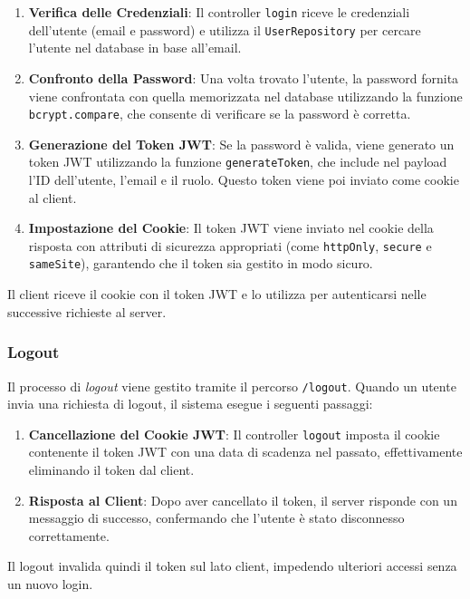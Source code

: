 \documentclass[twoside]{supsistudent}
\begin{document}
\begin{enumerate}
  \item \textbf{Verifica delle Credenziali}: Il controller \texttt{login} riceve le credenziali dell'utente (email e password) e utilizza il \texttt{UserRepository} per cercare l'utente nel database in base all'email.
  \item \textbf{Confronto della Password}: Una volta trovato l'utente, la password fornita viene confrontata con quella memorizzata nel database utilizzando la funzione \texttt{bcrypt.compare}, che consente di verificare se la password è corretta.
  \item \textbf{Generazione del Token JWT}: Se la password è valida, viene generato un token JWT utilizzando la funzione \texttt{generateToken}, che include nel payload l'ID dell'utente, l'email e il ruolo. Questo token viene poi inviato come cookie al client.
  \item \textbf{Impostazione del Cookie}: Il token JWT viene inviato nel cookie della risposta con attributi di sicurezza appropriati (come \texttt{httpOnly}, \texttt{secure} e \texttt{sameSite}), garantendo che il token sia gestito in modo sicuro.
\end{enumerate}

Il client riceve il cookie con il token JWT e lo utilizza per autenticarsi nelle successive richieste al server.

\subsubsection{Logout}

Il processo di \textit{logout} viene gestito tramite il percorso \texttt{/logout}. Quando un utente invia una richiesta di logout, il sistema esegue i seguenti passaggi:

\begin{enumerate}
  \item \textbf{Cancellazione del Cookie JWT}: Il controller \texttt{logout} imposta il cookie contenente il token JWT con una data di scadenza nel passato, effettivamente eliminando il token dal client.
  \item \textbf{Risposta al Client}: Dopo aver cancellato il token, il server risponde con un messaggio di successo, confermando che l'utente è stato disconnesso correttamente.
\end{enumerate}

Il logout invalida quindi il token sul lato client, impedendo ulteriori accessi senza un nuovo login.
\end{document}
